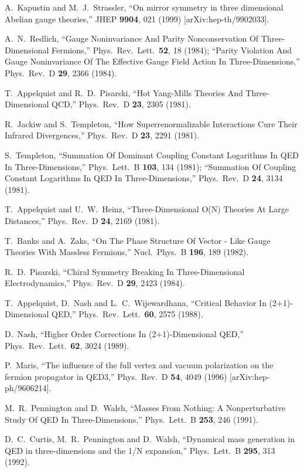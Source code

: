 \documentclass[a4paper,12pt, amsfonts, amssymb]{article}
\begin{document}
\begin{thebibliography}{99}
A.~Kapustin and M.~J.~Strassler,
``On mirror symmetry in three dimensional Abelian gauge theories,''
JHEP {\bf 9904}, 021 (1999) [arXiv:hep-th/9902033].

A.~N.~Redlich, ``Gauge Noninvariance And Parity Nonconservation Of Three-Dimensional  Fermions,'' Phys.\ Rev.\ Lett.\  {\bf 52}, 18 (1984);
``Parity Violation And Gauge Noninvariance Of The Effective Gauge Field 
Action In Three-Dimensions,'' Phys.\ Rev.\ D {\bf 29}, 2366 (1984).

T.~Appelquist and R.~D.~Pisarski, ``Hot Yang-Mills Theories And Three-Dimensional QCD,'' Phys.\ Rev.\ D {\bf 23}, 2305 (1981).

R.~Jackiw and S.~Templeton,
``How Superrenormalizable Interactions Cure Their Infrared Divergences,''
Phys.\ Rev.\ D {\bf 23}, 2291 (1981).

S.~Templeton,
``Summation Of Dominant Coupling Constant Logarithms In QED In Three-Dimensions,'' Phys.\ Lett.\ B {\bf 103}, 134 (1981);
``Summation Of Coupling Constant Logarithms In QED In Three-Dimensions,''
Phys.\ Rev.\ D {\bf 24}, 3134 (1981).

T.~Appelquist and U.~W.~Heinz,
``Three-Dimensional O(N) Theories At Large Distances,''
Phys.\ Rev.\ D {\bf 24}, 2169 (1981).


T.~Banks and A.~Zaks,
``On The Phase Structure Of Vector - Like Gauge Theories With Massless Fermions,'' Nucl.\ Phys.\ B {\bf 196}, 189 (1982).

R.~D.~Pisarski, ``Chiral Symmetry Breaking In Three-Dimensional Electrodynamics,'' Phys.\ Rev.\ D {\bf 29}, 2423 (1984).

T.~Appelquist, D.~Nash and L.~C.~Wijewardhana,
``Critical Behavior In (2+1)-Dimensional QED,''
Phys.\ Rev.\ Lett.\  {\bf 60}, 2575 (1988).

D.~Nash, ``Higher Order Corrections In (2+1)-Dimensional QED,''
Phys.\ Rev.\ Lett.\  {\bf 62}, 3024 (1989).

P.~Maris, ``The influence of the full vertex and vacuum polarization on the fermion  propagator in QED3,''
Phys.\ Rev.\ D {\bf 54}, 4049 (1996)
[arXiv:hep-ph/9606214].

M.~R.~Pennington and D.~Walsh, ``Masses From Nothing: A Nonperturbative Study Of QED In Three-Dimensions,'' Phys.\ Lett.\ B {\bf 253}, 246 (1991).

D.~C.~Curtis, M.~R.~Pennington and D.~Walsh,
``Dynamical mass generation in QED in three-dimensions and the 1/N expansion,'' Phys.\ Lett.\ B {\bf 295}, 313 (1992).


\end{thebibliography}
\end{document}
